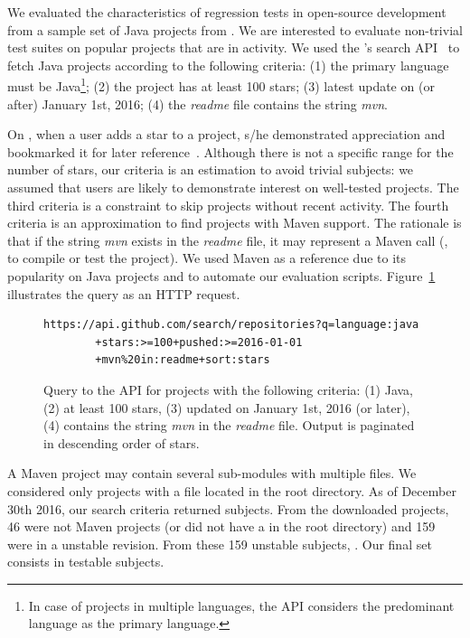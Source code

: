 We evaluated the characteristics of regression tests in open-source
development from a sample set of Java projects from \github{}.  We are
interested to evaluate non-trivial test suites on popular projects
that are in activity. We used the \github{}'s search
API~\cite{githubsearch} to fetch Java projects according to the
following criteria: (1) the primary language must be Java\footnote{In
case of projects in multiple languages, the \github{} API considers
the predominant language as the primary language.}; (2) the project
has at least 100 stars; (3) latest update on (or after) January 1st,
2016; (4) the \emph{readme} file contains the string \emph{mvn}.

On \github{}, when a user adds a star to a project, s/he demonstrated
appreciation and bookmarked it for later
reference~\cite{github-stars}.  Although there is not a specific range
for the number of stars, our criteria is an estimation to avoid
trivial subjects: we assumed that \github{} users are likely to
demonstrate interest on well-tested projects. The third criteria is a
constraint to skip projects without recent activity. The fourth
criteria is an approximation to find projects with Maven support. The
rationale is that if the string \emph{mvn} exists in the \emph{readme}
file, it may represent a Maven call (\eg, to compile or test the
project). We used Maven as a reference due to its popularity on Java
projects and to automate our evaluation scripts.
Figure~\ref{fig:subject-query} illustrates the query as an HTTP
request.

\begin{figure}[h!]
\centering
\scriptsize
{}
\begin{lstlisting}
https://api.github.com/search/repositories?q=language:java
        +stars:>=100+pushed:>=2016-01-01
        +mvn%20in:readme+sort:stars
\end{lstlisting}
    \caption{\label{fig:subject-query} Query to the \github{} API for
    projects with the following criteria: (1) Java, (2) at least 100
    stars, (3) updated on January 1st, 2016 (or later), (4) contains
    the string \emph{mvn} in the \emph{readme} file. Output is
    paginated in descending order of stars.}
\end{figure}

A Maven project may contain several sub-modules with multiple \pomf{}
files. We considered only projects with a \pomf{} file located in the
root directory.  As of December 30th 2016, our search criteria
returned \numSubjsTotal{} subjects. From the \numSubjsTotal{}
downloaded projects, 46 were not Maven projects (or did not have a
\pomf{} in the root directory) and 159 were in a unstable revision.
From these 159 unstable subjects, . Our final set consists in \numSubjs{} testable
subjects.

